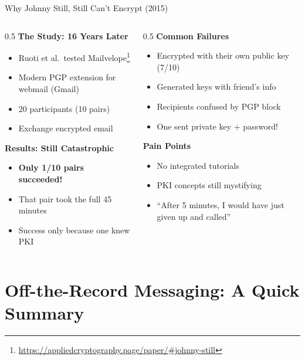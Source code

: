 \ifdefined\PRESENTATION\else\PassOptionsToClass{handout}{beamer}\fi\documentclass[aspectratio=169, lualatex]{beamer}
\begin{document}
\begin{frame}{Why Johnny Still, Still Can't Encrypt (2015)}
	\begin{columns}[T]
		\begin{column}{0.5\textwidth}
			\textbf{The Study: 16 Years Later}
			\begin{itemize}
				\item Ruoti et al.\ tested Mailvelope\footnote{\url{https://appliedcryptography.page/paper/\#johnny-still}}
				\item Modern PGP extension for webmail (Gmail)
				\item 20 participants (10 pairs)
				\item Exchange encrypted email
			\end{itemize}
			\textbf{Results: Still Catastrophic}
			\begin{itemize}
				\item \textbf{Only 1/10 pairs succeeded!}
				\item That pair took the full 45 minutes
				\item Success only because one knew PKI
			\end{itemize}
		\end{column}
		\begin{column}{0.5\textwidth}
			\textbf{Common Failures}
			\begin{itemize}
				\item Encrypted with their own public key (7/10)
				\item Generated keys with friend's info
				\item Recipients confused by PGP block
				\item One sent private key + password!
			\end{itemize}
			\textbf{Pain Points}
			\begin{itemize}
				\item No integrated tutorials
				\item PKI concepts still mystifying
				\item ``After 5 minutes, I would have just given up and called''
			\end{itemize}
		\end{column}
	\end{columns}
\end{frame}

\section{Off-the-Record Messaging: A Quick Summary}
\end{document}
